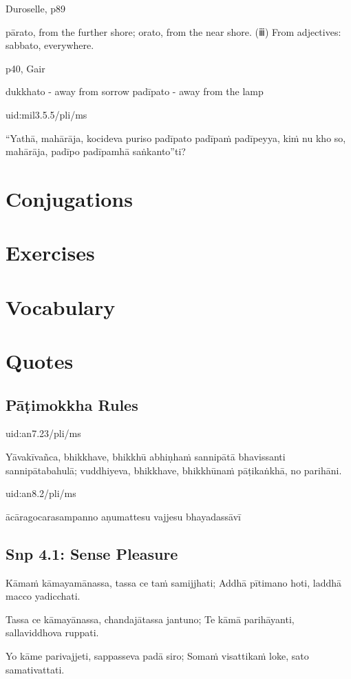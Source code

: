 \documentclass[11pt,oneside]{memoir}
\begin{document}
Duroselle, p89

pārato, from the further shore;
orato, from the near shore.
(ⅲ) From adjectives: sabbato, everywhere.

p40, Gair

dukkhato - away from sorrow
padīpato - away from the lamp

uid:mil3.5.5/pli/ms

“Yathā, mahārāja, kocideva puriso padīpato padīpaṁ padīpeyya, kiṁ nu kho so, mahārāja, padīpo padīpamhā saṅkanto”ti?

\section{Conjugations}
\label{sec:org80c791a}
\section{Exercises}
\label{sec:org7ab5869}
\section{Vocabulary}
\label{sec:orga5b8cce}
\section{Quotes}
\label{sec:org65d982e}
\subsection{Pāṭimokkha Rules}
\label{sec:org64bbaf5}

uid:an7.23/pli/ms

Yāvakīvañca, bhikkhave, bhikkhū abhiṇhaṁ sannipātā bhavissanti sannipātabahulā; vuddhiyeva, bhikkhave, bhikkhūnaṁ pāṭikaṅkhā, no parihāni.

uid:an8.2/pli/ms

ācāragocarasampanno aṇumattesu vajjesu bhayadassāvī

\subsection{Snp 4.1: Sense Pleasure}
\label{sec:orgcb95b18}

Kāmaṁ kāmayamānassa,
tassa ce taṁ samijjhati;
Addhā pītimano hoti,
laddhā macco yadicchati.

Tassa ce kāmayānassa,
chandajātassa jantuno;
Te kāmā parihāyanti,
sallaviddhova ruppati.

Yo kāme parivajjeti,
sappasseva padā siro;
Somaṁ visattikaṁ loke,
sato samativattati.
\end{document}
